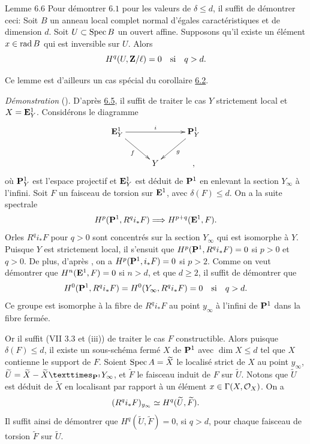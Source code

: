 \documentclass[10pt]{../fichiers-configuration-latex/smfart}
\begin{document}
\begin{enonce*}{Lemme 6.6}
Pour démontrer $6.1$ pour les valeurs de $\delta\leq d$, il suffit de
démontrer ceci: Soit $B$ un anneau local complet normal d'égales
caractéristiques et de dimension $d$. Soit $U\subset \operatorname{Spec} B$ un
ouvert affine. Supposons qu'il existe un élément $x\in \operatorname{rad} B$ qui est
inversible sur $U$. Alors
$$
H^{q}(U,\mathbf{Z}/\ell)=0\quad\text{\rm si}\quad q>d{}.
$$
\end{enonce*}

Ce lemme est d'ailleurs un cas spécial du corollaire \hyperref[XIX.cor6.2]{6.2}.

\medskip
\noindent
\emph{Démonstration} (\cf {}). D'après \hyperref[XIX.lem6.5]{6.5},
il suffit de traiter le cas $Y$ strictement local et
$X=\mathbf{E}^{1}_{Y}$. Considérons le diagramme
$$
\xymatrix@C=1cm@R=.8cm{
\EE^{1}_Y \ar[rr]^{i} \ar[rd]_{f}&   & \PP^{1}_Y \ar[ld]^{g}\\
          & Y &,
}
$$
où $\mathbf{P}^{1}_{Y}$ est l'espace projectif et $\mathbf{E}^{1}_{Y}$
est déduit de $\mathbf{P}^{1}$ en enlevant la section $Y_{\infty}$ à
l'infini. Soit $F$ un faisceau de torsion sur $\mathbf{E}^{1}$, avec
$\delta(F)\leq d$. On a la suite spectrale 
$$
H^{p}(\mathbf{P}^{1},R^{q}i_{\ast}F)\Longrightarrow
H^{p+q}(\mathbf{E}^{1},F){}.
$$
Or\pageoriginale les $R^{q}i_{\ast}F$ pour $q>0$ sont concentrés sur
la section $Y_{\infty}$ qui est isomorphe à $Y$. Puisque $Y$ est
strictement local, il s'ensuit que $H^{p}(\mathbf{P}^{1},
R^{q}i_{\ast}F)=0$ si $p>0$ et $q>0$. De plus, d'après , on a
$H^{p}(\mathbf{P}^{1}, i_{\ast}F)=0$ si $p>2$. Comme on veut démontrer
que $H^{n}(\mathbf{E}^{1},F)=0$ si $n>d$, et que $d\geq 2$, il suffit
de démontrer que
$$
H^{0}(\mathbf{P}^{1},
R^{q}i_{\ast}F)=H^{0}(Y_{\infty},R^{q}i_{\ast}F)=0\quad\text{\rm
si}\quad q>d{}.
$$
Ce groupe est isomorphe à la fibre de $R^{q}i_{\ast}F$ au point
$y_{\infty}$ à l'infini de $\mathbf{P}^{1}$ dans la fibre fermée.

Or il suffit (VII 3.3 et  (iii)) de traiter le cas $F$
constructible. Alors puisque $\delta(F)\leq d$, il existe un
sous-schéma fermé $X$ de $\mathbf{P}^{1}$ avec $\dim X\leq d$ tel que
$X$ contienne le support de $F$. Soient $\operatorname{Spec} A=\widetilde{X}$ le
localisé strict de $X$ au point $y_{\infty}$,
$\widetilde{U}=\widetilde{X}-\fprod{\widetilde{X}}{Y_{\infty}}{\PP^{1}}$,
et $\widetilde{F}$ le faisceau induit de $F$ sur $\widetilde{U}$. Notons que $\widetilde{U}$
est déduit de $\widetilde{X}$ en localisant par rapport à un élément
$x\in \Gamma(X,{\mathcal O}_{X})$. On a
$$
(R^{q}i_{\ast}F)_{y_{\infty}}\simeq
H^{q}(\widetilde{U},\widetilde{F}){}.
$$
Il suffit ainsi de démontrer que $H^{q}(\widetilde{U},\widetilde{F})=0$, si $q>d$,
pour chaque faisceau de torsion $\widetilde{F}$ sur $\widetilde{U}$.
\end{document}
